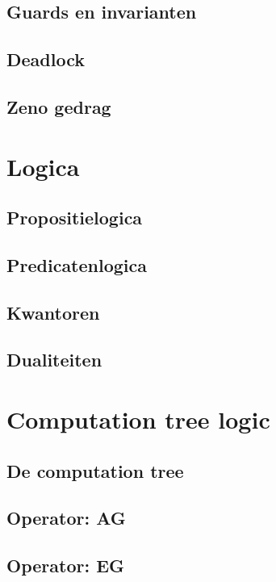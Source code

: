 \documentclass{article}
\begin{document}
	\subsection{Guards en invarianten}
	
	\subsection{Deadlock}
	
	\subsection{Zeno gedrag}
	
	\section{Logica}
	
	\subsection{Propositielogica}
	
	\subsection{Predicatenlogica}
	
	\subsection{Kwantoren}
	
	\subsection{Dualiteiten}
	
	\section{Computation tree logic}
	
	\subsection{De computation tree}
	
	\subsection{Operator: AG}

	\subsection{Operator: EG}
	
\end{document}
